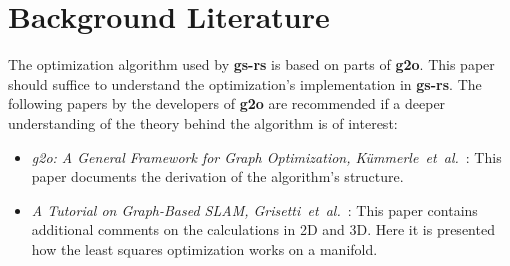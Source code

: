 \section{Background Literature}
The optimization algorithm used by \textbf{gs-rs} is based on parts of \textbf{g2o}. This paper should suffice to understand the optimization's implementation in \textbf{gs-rs}. The following papers by the developers of \textbf{g2o} are recommended if a deeper understanding of the theory behind the algorithm is of interest:
\begin{itemize}
	\item \textit{g2o: A General Framework for Graph Optimization, Kümmerle~et~al.}~\cite{kummerle2011g2o}: This paper documents the derivation of the algorithm's structure.
	\item \textit{A Tutorial on Graph-Based SLAM, Grisetti~et~al.}~\cite{grisetti2010tutorial}: This paper contains additional comments on the calculations in 2D and 3D. Here it is presented how the least squares optimization works on a manifold.
\end{itemize}